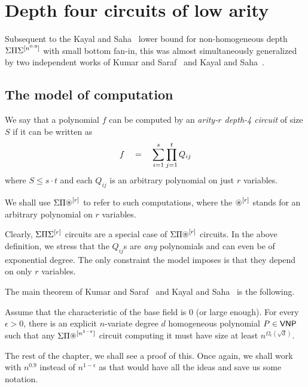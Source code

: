 \chapter{Depth four circuits of low arity}

Subsequent to the Kayal and Saha~\cite{KayalSaha14} lower bound for non-homogeneous depth $\Sigma\Pi\Sigma^{[n^{0.9}]}$ with small bottom fan-in, this was almost simultaneously generalized by two independent works of Kumar and Saraf~\cite{KumarSaraf15} and Kayal and Saha~\cite{KayalSaha15}.

\section{The model of computation}

\begin{definition} We say that a polynomial $f$ can be computed by an \emph{arity-$r$ depth-4 circuit} of size $S$ if it can be written as
\[
f \quad = \quad \sum_{i=1}^s \prod_{j=1}^t Q_{ij}
\]
where $S \leq s \cdot t$ and each $Q_{ij}$ is an arbitrary polynomial on just $r$ variables. 

We shall use $\SPA^{[r]}$ to refer to such computations, where the $\circast^{[r]}$ stands for an arbitrary polynomial on $r$ variables. 
\end{definition}

Clearly, $\Sigma\Pi\Sigma^{[r]}$ circuits are a special case of $\SPA^{[r]}$ circuits. In the above definition, we stress that the $Q_{ij}$s are \emph{any} polynomials and can even be of exponential degree. The only constraint the model imposes is that they depend on only $r$ variables. 

The main theorem of Kumar and Saraf~\cite{KumarSaraf15} and Kayal and Saha~\cite{KayalSaha15} is the following.

\begin{theorem}\label{thm:low-arity-lb} Assume that the characteristic of the base field is $0$ (or large enough). For every $\epsilon > 0$, there is an explicit $n$-variate degree $d$ homogeneous polynomial $P \in \mathsf{VNP}$ such that any $\SPA^{[n^{1-\epsilon}]}$ circuit computing it must have size at least $n^{\Omega_\epsilon(\sqrt{d})}$. 
\end{theorem}

The rest of the chapter, we shall see a proof of this. Once again, we shall work with $n^{0.9}$ instead of $n^{1-\epsilon}$ as that would have all the ideas and save us some notation. 

